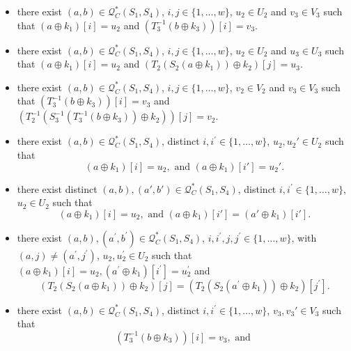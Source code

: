 \begin{itemize}
  \item[\cone]
  there exist $(a, b) \in \mathcal{Q}_{C}^{*}\left(S_{1}, S_{4}\right)$, $i, j \in\{1, \ldots, w\}$, $u_{2} \in U_{2}$ and $v_{3} \in V_{3}$ such that $\left(a \oplus k_{1}\right)[i] = u_2$ and $\left(T_{3}^{-1}\left(b \oplus k_{3}\right)\right)[i] = v_3$.
  \item[\ctwo]
  there exist $(a, b) \in \mathcal{Q}_{C}^{*}\left(S_{1}, S_{4}\right)$, $i, j \in\{1, \ldots, w\}$, $u_{2} \in U_{2}$ and $u_{3} \in U_{3}$ such that $\left(a \oplus k_{1}\right)[i] = u_2$ and $\left(T_{2}\left(S_{2}\left(a \oplus k_{1}\right)\right) \oplus k_{2}\right)[j] = u_3$.
  \item[\cthree]
  there exist $(a, b) \in \mathcal{Q}_{C}^{*}\left(S_{1}, S_{4}\right)$, $i, j \in\{1, \ldots, w\}$, $v_{2} \in V_{2}$ and $v_{3} \in V_{3}$ such that $\left(T_{3}^{-1}\left(b \oplus k_{3}\right)\right)[i] = v_3$ and $\left(T_{2}^{-1}\left(S_{3}^{-1}\left(T_{3}^{-1}\left(b \oplus k_{3}\right)\right) \oplus k_{2}\right)\right)[j] = v_2$.
  \item[\cfour]
  there exist $(a, b) \in \mathcal{Q}_{C}^{*}\left(S_{1}, S_{4}\right)$, distinct $i, i^{\prime}\in\{1, \ldots, w\}$, $u_{2},u_{2}' \in U_{2}$ such that
  $$\left(a \oplus k_{1}\right)[i] = u_2,\text{ and }
  \left(a \oplus k_{1}\right)[i']= u_2'.$$
  \item[\cfive]
  there exist distinct $(a, b),(a',b') \in \mathcal{Q}_{C}^{*}\left(S_{1}, S_{4}\right)$, distinct $i, i^{\prime}\in\{1, \ldots, w\}$, $u_{2} \in U_{2}$ such that
  $$\left(a \oplus k_{1}\right)[i] = u_2,\text{ and }
  \left(a \oplus k_{1}\right)[i']=\left(a' \oplus k_{1}\right)[i'].$$
  \item[\csix]
  there exist $(a, b), (a^{\prime}, b^{\prime}) \in \mathcal{Q}_{C}^{*}\left(S_{1}, S_{4}\right)$, $i, i^{\prime},j, j^{\prime} \in\{1, \ldots, w\}$, with$(a, j) \neq \left(a^{\prime}, j^{\prime}\right)$, $u_{2}, u_{2}^{\prime} \in U_{2}$ such that $\left(a \oplus k_{1}\right)[i] = u_2, \left(a^{\prime} \oplus k_{1}\right)[i^{\prime}] = u_2^{\prime}$ and
$$
  \left(T_{2}\left(S_{2}\left(a \oplus k_{1}\right)\right) \oplus k_{2}\right)[j] = \left(T_{2}\left(S_{2}\left(a^{\prime} \oplus k_{1}\right)\right) \oplus k_{2}\right)[j^{\prime}].
$$
 \item[\cseven]
  there exist $(a, b) \in \mathcal{Q}_{C}^{*}\left(S_{1}, S_{4}\right)$, distinct $i, i^{\prime}\in\{1, \ldots, w\}$, $v_{3},v_{3}' \in V_{3}$ such that
  $$\left(T_{3}^{-1}\left(b \oplus k_{3}\right)\right)[i] = v_3,\text{ and }
$$
\end{itemize}
